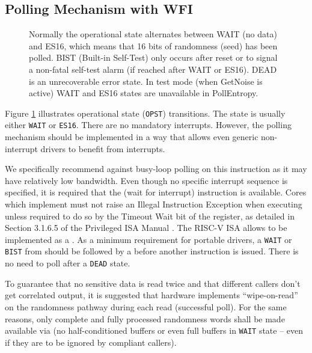 \subsection{Polling Mechanism with WFI}
\label{sec:es-polling}

\begin{figure}[tb]
    \centering
    
    \caption{Normally the operational state alternates between WAIT
        (no data) and ES16, which means that 16 bits of randomness (seed)
        has been polled. BIST (Built-in Self-Test) only occurs after reset
        or to signal a non-fatal self-test alarm (if reached after WAIT or
        ES16). DEAD is an unrecoverable error state.
        In test mode (when GetNoise is active) WAIT and ES16 states are
        unavailable in PollEntropy.}
    \label{fig:esstate_tikz}
\end{figure}

    Figure \ref{fig:esstate_tikz} illustrates operational state
    (\verb|OPST|) transitions. The state is usually either \verb|WAIT| or
    \verb|ES16|. There are no mandatory interrupts. However, the polling
    mechanism should be implemented in a way that allows even generic
    non-interrupt drivers to benefit from interrupts.

    We specifically recommend against busy-loop polling on this instruction
    as it may have relatively low bandwidth. Even though no specific interrupt
    sequence is specified, it is required that the  (wait for
    interrupt) instruction is available.
    Cores which implement  must not raise an Illegal
    Instruction Exception when executing  unless required to
    do so by the Timeout Wait bit of the  register,
    as detailed in Section 3.1.6.5 of the Privileged ISA Manual \cite{_WaAs19A}.
    The RISC-V ISA allows  to be implemented as a .
    As a minimum requirement for portable drivers, a \verb|WAIT| or
    \verb|BIST| from  should be followed by a
     before another  instruction is
    issued. There is no need to poll after a \verb|DEAD| state.

    To guarantee that no sensitive data is read twice and that different
    callers don't get correlated output, it is suggested that hardware
    implements ``wipe-on-read'' on the randomness pathway during each read
    (successful poll). For the same reasons, only complete and fully
    processed randomness words shall be made available via
     (no half-conditioned buffers or even full buffers
    in \verb|WAIT| state -- even if they are to be ignored by compliant
    callers).


